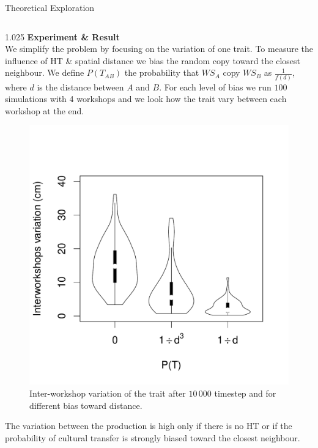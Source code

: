 \documentclass[final]{beamer}
\newlength{\onecolwid}
\newlength{\twocolwid}
\begin{document}
\begin{frame}[t]
\begin{columns}[t]
\begin{column}{\twocolwid}
\begin{block}{Theoretical Exploration}
\begin{columns}[t,totalwidth=\twocolwid]
\begin{column}{1.025\onecolwid}
{\textbf{Experiment \& Result}}\\
We simplify the problem by focusing on the variation of one trait. To measure the influence of HT \& spatial distance we bias the random copy toward the closest neighbour. We define $P(T_{AB})$ the probability that $WS_A$ copy $WS_B$ as $\frac{1}{f(d)}$, where $d$ is the distance between $A$ and $B$.
For each level of bias we run $100$ simulations with 4 workshops and we look how the trait vary between each workshop at the end.\vspace{-.7cm}


    \begin{figure}[h!]
    \centering
%	    
	\includegraphics[width=0.5\linewidth]{images/interworkshopvar.pdf}
\singlespace
\caption{Inter-workshop variation of the trait after $10\,000$ timestep and for different bias toward distance.}%
	
	\label{fig:resmod}
    \end{figure}

The variation between the production is high only if there is no HT or if the probability of cultural transfer is strongly biased toward the closest neighbour.

    
\end{column}
\end{columns}


\end{block}
\end{column}
\end{columns}
\end{frame}
\end{document}
